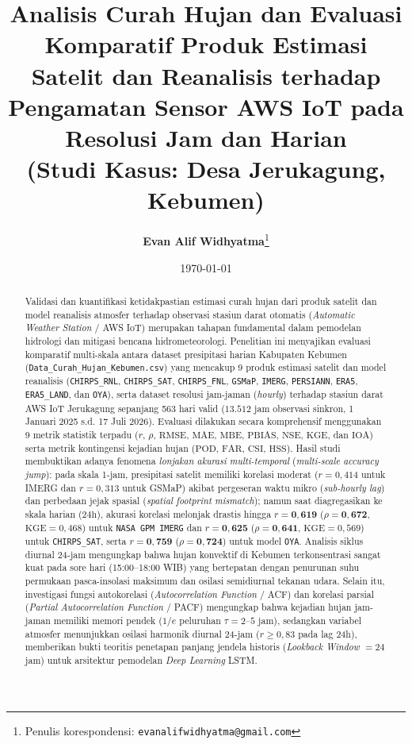 \documentclass[11pt,a4paper]{article}
\title{\vspace{-1.2cm}\textbf{\Large Analisis Curah Hujan dan Evaluasi Komparatif Produk Estimasi Satelit dan Reanalisis terhadap Pengamatan Sensor AWS IoT pada Resolusi Jam dan Harian \\ (Studi Kasus: Desa Jerukagung, Kebumen)}}
\author[1]{\textbf{Evan Alif Widhyatma}\thanks{Penulis korespondensi: \texttt{evanalifwidhyatma@gmail.com}}}
\affil[1]{\small Program Studi Sains Data, Fakultas Sains dan Teknologi, Universitas Putra Bangsa, Kebumen, Jawa Tengah, Indonesia}
\date{\small\today}
\begin{document}
\maketitle

\begin{abstract}
\noindent Validasi dan kuantifikasi ketidakpastian estimasi curah hujan dari produk satelit dan model reanalisis atmosfer terhadap observasi stasiun darat otomatis (\textit{Automatic Weather Station} / AWS IoT) merupakan tahapan fundamental dalam pemodelan hidrologi dan mitigasi bencana hidrometeorologi. Penelitian ini menyajikan evaluasi komparatif multi-skala antara dataset presipitasi harian Kabupaten Kebumen (\texttt{Data\_Curah\_Hujan\_Kebumen.csv}) yang mencakup 9 produk estimasi satelit dan model reanalisis (\texttt{CHIRPS\_RNL}, \texttt{CHIRPS\_SAT}, \texttt{CHIRPS\_FNL}, \texttt{GSMaP}, \texttt{IMERG}, \texttt{PERSIANN}, \texttt{ERA5}, \texttt{ERA5\_LAND}, dan \texttt{OYA}), serta dataset resolusi jam-jaman (\textit{hourly}) terhadap stasiun darat AWS IoT Jerukagung sepanjang 563 hari valid ($13.512$ jam observasi sinkron, 1 Januari 2025 s.d. 17 Juli 2026). Evaluasi dilakukan secara komprehensif menggunakan 9 metrik statistik terpadu ($r$, $\rho$, $\text{RMSE}$, $\text{MAE}$, $\text{MBE}$, $\text{PBIAS}$, $\text{NSE}$, $\text{KGE}$, dan $\text{IOA}$) serta metrik kontingensi kejadian hujan ($\text{POD}$, $\text{FAR}$, $\text{CSI}$, $\text{HSS}$). Hasil studi membuktikan adanya fenomena \textit{lonjakan akurasi multi-temporal} (\textit{multi-scale accuracy jump}): pada skala 1-jam, presipitasi satelit memiliki korelasi moderat ($r = 0{,}414$ untuk IMERG dan $r = 0{,}313$ untuk GSMaP) akibat pergeseran waktu mikro (\textit{sub-hourly lag}) dan perbedaan jejak spasial (\textit{spatial footprint mismatch}); namun saat diagregasikan ke skala harian ($24\text{h}$), akurasi korelasi melonjak drastis hingga $r = \mathbf{0{,}619}$ ($\rho = \mathbf{0{,}672}$, $\text{KGE} = 0{,}468$) untuk \texttt{NASA GPM IMERG} dan $r = \mathbf{0{,}625}$ ($\rho = \mathbf{0{,}641}$, $\text{KGE} = 0{,}569$) untuk \texttt{CHIRPS\_SAT}, serta $r = \mathbf{0{,}759}$ ($\rho = \mathbf{0{,}724}$) untuk model \texttt{OYA}. Analisis siklus diurnal 24-jam mengungkap bahwa hujan konvektif di Kebumen terkonsentrasi sangat kuat pada sore hari (15:00--18:00 WIB) yang bertepatan dengan penurunan suhu permukaan pasca-insolasi maksimum dan osilasi semidiurnal tekanan udara. Selain itu, investigasi fungsi autokorelasi (\textit{Autocorrelation Function} / ACF) dan korelasi parsial (\textit{Partial Autocorrelation Function} / PACF) mengungkap bahwa kejadian hujan jam-jaman memiliki memori pendek ($1/e$ peluruhan $\tau = 2$--$5$ jam), sedangkan variabel atmosfer menunjukkan osilasi harmonik diurnal 24-jam ($r \ge 0{,}83$ pada lag 24h), memberikan bukti teoritis penetapan panjang jendela historis (\textit{Lookback Window} $= 24$ jam) untuk arsitektur pemodelan \textit{Deep Learning} LSTM.
\end{abstract}
\end{document}
